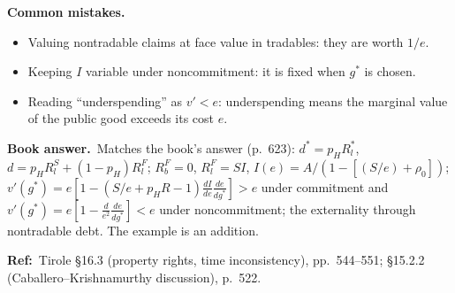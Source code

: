 \documentclass[11pt,a4paper]{article}
\newcommand{\bookans}{\par\medskip\noindent\textbf{Book answer.}~}
\newcommand{\refbib}{\par\smallskip\noindent\textbf{Ref:}~}
\newcommand{\pitfalls}{\par\medskip\noindent\textbf{Common mistakes.}}
\begin{document}
\pitfalls
\begin{itemize}
  \item Valuing nontradable claims at face value in tradables: they are worth $1/e$.
  \item Keeping $I$ variable under noncommitment: it is fixed when $g^*$ is chosen.
  \item Reading ``underspending'' as $v'<e$: underspending means the marginal value of the public good exceeds its cost $e$.
\end{itemize}

\bookans Matches the book's answer (p.~623): $d^*=p_HR_l^*$, $d=p_HR_l^S+(1-p_H)R_l^F$; $R_b^F=0$, $R_l^F=SI$, $I(e)=A/(1-[(S/e)+\rho_0])$; $v'(g^*)=e[1-(S/e+p_HR-1)\frac{dI}{de}\frac{de}{dg^*}]>e$ under commitment and $v'(g^*)=e[1-\frac{d}{e^2}\frac{de}{dg^*}]<e$ under noncommitment; the externality through nontradable debt. The example is an addition.
\refbib{Tirole \S16.3 (property rights, time inconsistency), pp.~544--551; \S15.2.2 (Caballero--Krishnamurthy discussion), p.~522.}
\end{document}
